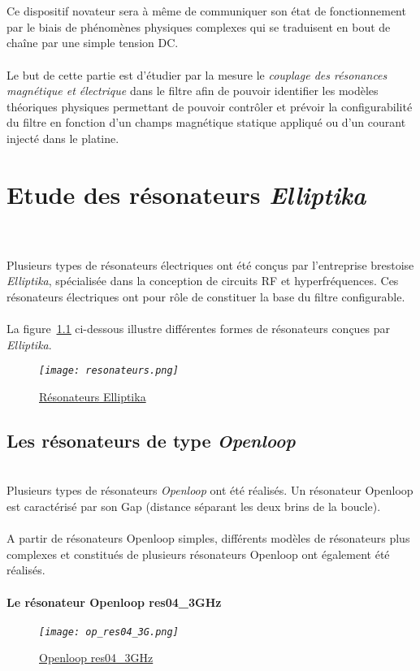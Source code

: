 \documentclass[12pt,fleqn]{book} %
\begin{document}
~\\\\
\normalsize Ce dispositif novateur sera à même de communiquer son état de fonctionnement par le
biais de phénomènes physiques complexes qui se traduisent en bout de chaîne par une simple tension
DC.
~\\\\Le but de cette partie est d'étudier par la mesure le \emph{couplage des résonances magnétique et électrique} dans le filtre afin de pouvoir identifier les modèles théoriques physiques permettant de pouvoir contrôler et prévoir la configurabilité du filtre en fonction d'un champs magnétique statique appliqué ou d'un courant injecté dans le platine.

\setcounter{chapter}{0}
\chapter{Etude des résonateurs \emph{Elliptika}} 
~\\\\\indent Plusieurs types de résonateurs électriques ont été conçus par l'entreprise brestoise \emph{Elliptika}, spécialisée dans la conception de circuits RF et hyperfréquences. Ces résonateurs électriques ont pour rôle de constituer la base du filtre configurable.
~\\\\La figure~\underline{\color{blue}\ref{resonateurs}} ci-dessous illustre différentes formes de résonateurs conçues par \emph{Elliptika}.
\begin{figure}[H]
	\centering
	\itshape
	\texttt{[image: resonateurs.png]}
	\caption{\label{resonateurs} \underline{Résonateurs Elliptika}}
\end{figure}
\section{Les résonateurs de type \emph{Openloop}}
~\\\noindent Plusieurs types de résonateurs \emph{Openloop} ont été réalisés. Un résonateur Openloop est caractérisé par son Gap (distance séparant les deux brins de la boucle). 
~\\\\A partir de résonateurs Openloop simples, différents modèles de résonateurs plus complexes et constitués de plusieurs résonateurs Openloop ont également été réalisés. 
~\\
\subsubsection{Le résonateur Openloop res04\_3GHz}
\begin{figure}[H]
	\centering
	\itshape
	\texttt{[image: op\_res04\_3G.png]}
	\caption{\label{op_res04_3G} \underline{Openloop res04\_3GHz}}
\end{figure}
\noindent 
\end{document}
